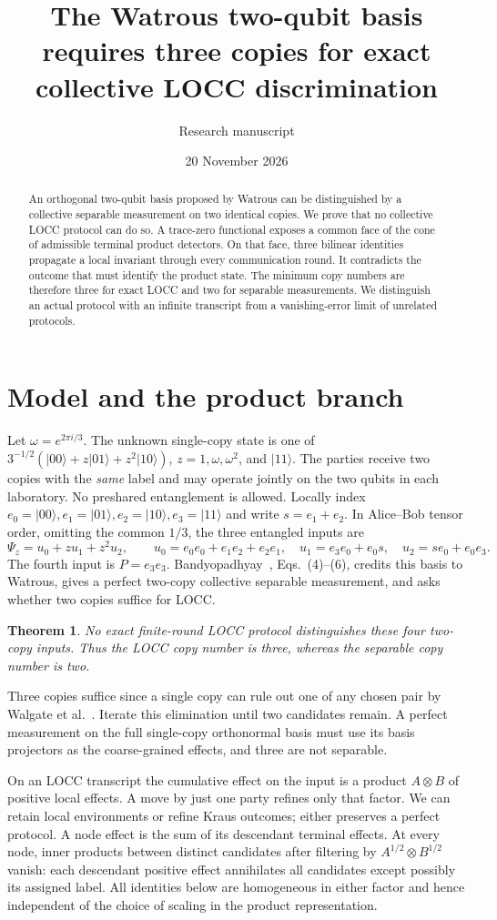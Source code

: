 \documentclass[11pt]{article}
\title{The Watrous two-qubit basis requires three copies for exact collective LOCC discrimination}
\author{Research manuscript}\date{20 November 2026}
\newtheorem{theorem}{Theorem}\newtheorem{lemma}[theorem]{Lemma}\newtheorem{proposition}[theorem]{Proposition}
\newcommand{\ket}[1]{|#1\rangle}\newcommand{\bra}[1]{\langle#1|}\newcommand{\Id}{\mathbb I}
\begin{document}
\maketitle
\begin{abstract}\noindent
An orthogonal two-qubit basis proposed by Watrous can be distinguished by a collective separable measurement on two identical copies. We prove that no collective LOCC protocol can do so. A trace-zero functional exposes a common face of the cone of admissible terminal product detectors. On that face, three bilinear identities propagate a local invariant through every communication round. It contradicts the outcome that must identify the product state. The minimum copy numbers are therefore three for exact LOCC and two for separable measurements. We distinguish an actual protocol with an infinite transcript from a vanishing-error limit of unrelated protocols.
\end{abstract}
\section{Model and the product branch}
Let $\omega=e^{2\pi i/3}$. The unknown single-copy state is one of
$3^{-1/2}(\ket{00}+z\ket{01}+z^2\ket{10})$, $z=1,\omega,\omega^2$, and $\ket{11}$.
The parties receive two copies with the \emph{same} label and may operate jointly on the two qubits in each laboratory. No preshared entanglement is allowed. Locally index $e_0=\ket{00},e_1=\ket{01},e_2=\ket{10},e_3=\ket{11}$ and write $s=e_1+e_2$.
In Alice--Bob tensor order, omitting the common $1/3$, the three entangled inputs are
\[
 \Psi_z=u_0+zu_1+z^2u_2,\qquad
 u_0=e_0e_0+e_1e_2+e_2e_1,\quad
 u_1=e_3e_0+e_0s,\quad u_2=se_0+e_0e_3.
\]
The fourth input is $P=e_3e_3$. Bandyopadhyay~\cite{B}, Eqs.~(4)--(6), credits this basis to Watrous, gives a perfect two-copy collective separable measurement, and asks whether two copies suffice for LOCC.
\begin{theorem}\label{thm}
No exact finite-round LOCC protocol distinguishes these four two-copy inputs. Thus the LOCC copy number is three, whereas the separable copy number is two.
\end{theorem}
Three copies suffice since a single copy can rule out one of any chosen pair by Walgate et al.~\cite{W}. Iterate this elimination until two candidates remain. A perfect measurement on the full single-copy orthonormal basis must use its basis projectors as the coarse-grained effects, and three are not separable.

On an LOCC transcript the cumulative effect on the input is a product $A\otimes B$ of positive local effects. A move by just one party refines only that factor. We can retain local environments or refine Kraus outcomes; either preserves a perfect protocol. A node effect is the sum of its descendant terminal effects. At every node, inner products between distinct candidates after filtering by $A^{1/2}\otimes B^{1/2}$ vanish: each descendant positive effect annihilates all candidates except possibly its assigned label. All identities below are homogeneous in either factor and hence independent of the choice of scaling in the product representation.
\end{document}
